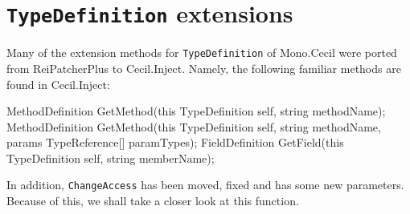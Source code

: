 \documentclass[a4paper,11pt]{article}
\newcommand{\CecilInject}{\textsc{C}{\scriptsize \sc ecil}.\textsc{I}{\scriptsize \sc nject}}
\begin{document}
\section{\texttt{TypeDefinition} extensions}
Many of the extension methods for \texttt{TypeDefinition} of Mono.Cecil were ported from ReiPatcherPlus to \CecilInject{}.
Namely, the following familiar methods are found in \CecilInject{}:
\begin{cs}
MethodDefinition GetMethod(this TypeDefinition self, string methodName);
MethodDefinition GetMethod(this TypeDefinition self,
                           string methodName,
                           params TypeReference[] paramTypes);
FieldDefinition GetField(this TypeDefinition self, string memberName);
\end{cs}
In addition, \texttt{ChangeAccess} has been moved, fixed and has some new parameters. Because of this, we shall take a closer look at this function.
\end{document}
